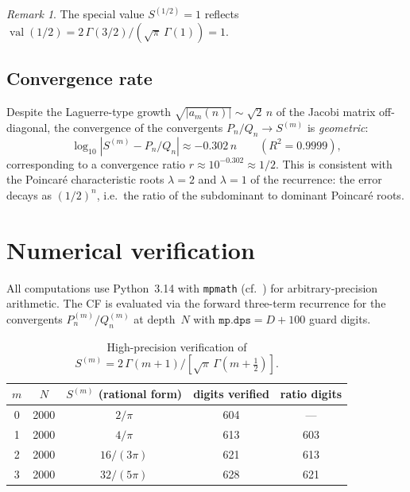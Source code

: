 \documentclass[11pt]{article}
\newcommand{\half}{\tfrac{1}{2}}
\newcommand{\val}{\operatorname{val}}
\theoremstyle{definition}
\theoremstyle{remark}
\newtheorem{remark}[theorem]{Remark}
\begin{document}
\begin{remark}
The special value $S^{(1/2)} = 1$ reflects
$\val(1/2) = 2\,\Gamma(3/2)/(\sqrt{\pi}\,\Gamma(1)) = 1$.
\end{remark}

\subsection{Convergence rate}

Despite the Laguerre-type growth $\sqrt{|a_m(n)|} \sim \sqrt{2}\,n$
of the Jacobi matrix off-diagonal, the convergence of the
convergents $P_n/Q_n \to S^{(m)}$ is \emph{geometric}:
\begin{equation}\label{eq:rate}
  \log_{10}|S^{(m)} - P_n/Q_n| \approx -0.302\,n
  \qquad (R^2 = 0.9999),
\end{equation}
corresponding to a convergence ratio $r \approx 10^{-0.302} \approx 1/2$.
This is consistent with the Poincar\'e characteristic roots
$\lambda = 2$ and $\lambda = 1$ of the recurrence:
the error decays as $(1/2)^n$, i.e.\ the ratio of the
subdominant to dominant Poincar\'e roots.


\section{Numerical verification}\label{sec:numerical}

All computations use Python~3.14 with \texttt{mpmath}
(cf.~\cite{johansson2017arb})
for arbitrary-precision arithmetic.
The CF is evaluated via the forward three-term recurrence
for the convergents $P_n^{(m)}/Q_n^{(m)}$ at depth~$N$
with $\texttt{mp.dps} = D + 100$ guard digits.

\begin{table}[h]
\centering
\caption{High-precision verification of
$S^{(m)} = 2\,\Gamma(m{+}1)/[\sqrt\pi\,\Gamma(m{+}\half)]$.}
\label{tab:precision}
\begin{tabular}{@{}ccccc@{}}
\toprule
$m$ & $N$ & $S^{(m)}$ (rational form) & digits verified & ratio digits \\
\midrule
0 & 2000 & $2/\pi$ & 604 & --- \\
1 & 2000 & $4/\pi$ & 613 & 603 \\
2 & 2000 & $16/(3\pi)$ & 621 & 613 \\
3 & 2000 & $32/(5\pi)$ & 628 & 621 \\
\bottomrule
\end{tabular}
\end{table}
\end{document}
